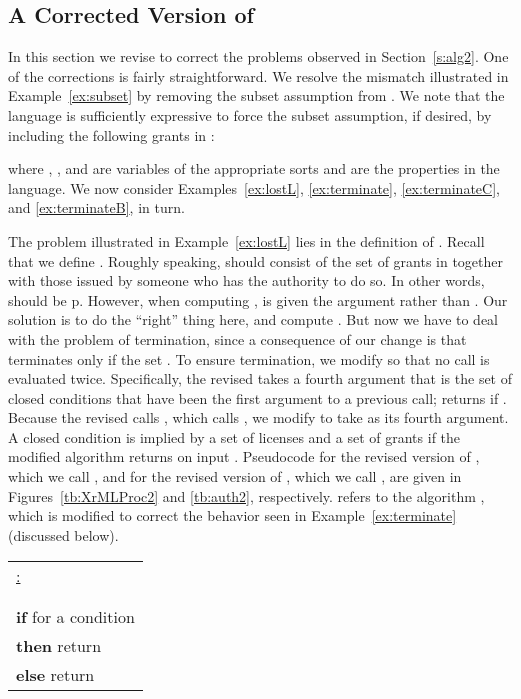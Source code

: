 \documentclass{acmtrans2m}
\newcommand{\<}{
}
\renewcommand{\>}{\rangle}
\begin{document}
\subsection{A Corrected Version of }\label{s:alg3}
In this section we revise  to correct the problems observed in Section~\ref{s:alg2}.  One of the
corrections is fairly straightforward.  We resolve the mismatch illustrated in Example~\ref{ex:subset} by
removing the subset assumption from .  We note that the language is sufficiently expressive to force
the subset assumption, if desired, by including the following grants in :

where , , and  are variables of the appropriate sorts and  are the
properties in the language.  We now consider Examples~\ref{ex:lostL}, \ref{ex:terminate},
\ref{ex:terminateC}, and \ref{ex:terminateB}, in turn.

\begin{sloppypar}
The problem illustrated in Example~\ref{ex:lostL} lies in the definition of .
Recall that we define .  Roughly speaking, 
should consist of the set of grants in  together with those issued by someone
who has the authority to do so.  In other words,  should be
p.  However, when computing
,  is given the argument 
rather than .  Our solution is to do the ``right'' thing here, and compute
.  But now we have to deal with the problem of
termination, since a consequence of our change is that  terminates
only if the set .  To ensure termination, we modify  so that no
call is evaluated twice.  Specifically, the revised  takes a fourth argument
 that is the set of closed conditions that have been the first argument to a
previous call;  returns  if .  Because
the revised  calls , which calls , we modify  to take
 as its fourth argument.  A closed condition  is implied by a set  of
licenses and a set  of grants if the modified  algorithm returns 
on input .  Pseudocode for the revised version of ,
which we call , and for the revised version of , which we call
, are given in Figures~\ref{tb:XrMLProc2} and \ref{tb:auth2}, respectively.
 refers to the algorithm , which is  modified to correct
the behavior seen in Example~\ref{ex:terminate} (discussed below).
\end{sloppypar}

\begin{figure*}[htb]
\begin{center}
\begin{tabular}{|l|}\hline
\underline{:}\\\\
\\
{\bf if}  for a condition \\
{\bf then} return \\
{\bf else} return \\
\hline
\end{tabular}
\end{center}
\caption{The  Algorithm}
\label{tb:XrMLProc2}
\end{figure*}
\end{document}
